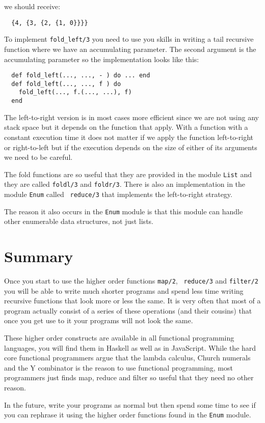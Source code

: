\documentclass[a4paper,11pt]{article}
\begin{document}
we should receive:

\begin{verbatim}
  {4, {3, {2, {1, 0}}}}
\end{verbatim}

To implement {\tt fold\_left/3} you need to use you skills in writing a
tail recursive function where we have an accumulating parameter. The
second argument is the accumulating parameter so the implementation
looks like this:

\begin{verbatim}
  def fold_left(..., ..., - ) do ... end
  def fold_left(..., ..., f ) do
    fold_left(..., f.(..., ...), f) 
  end  
\end{verbatim}

The left-to-right version is in most cases more efficient since we are
not using any stack space but it depends on the function that
apply. With a function with a constant execution time it does not
matter if we apply the function left-to-right or right-to-left but if
the execution depends on the size of either of its arguments we need
to be careful.

The fold functions are so useful that they are provided in the module
{\tt List} and they are called {\tt foldl/3} and {\tt foldr/3}. There
is also an implementation in the module {\tt Enum} called {\tt
  reduce/3} that implements the left-to-right strategy.

The reason it also occurs in the {\tt Enum} module is that this module
can handle other enumerable data structures, not just lists.



\section*{Summary}

Once you start to use the higher order functions {\tt map/2}, {\tt
  reduce/3} and {\tt filter/2} you will be able to write much shorter
programs and spend less time writing recursive functions that look
more or less the same. It is very often that most of a program actually
consist of a series of these operations (and their cousins) that once
you get use to it your programs will not look the same.

These higher order constructs are available in all functional
programming languages, you will find them in Haskell as well as in
JavaScript. While the hard core functional programmers argue that the
lambda calculus, Church numerals and the Y combinator is the reason to
use functional programming, most programmers just finds map, reduce and
filter so useful that they need no other reason.

In the future, write your programs as normal but then spend some time
to see if you can rephrase it using the higher order functions found
in the {\tt Enum} module.
\end{document}
